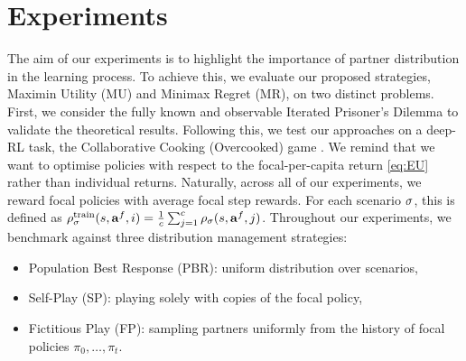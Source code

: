 \section{Experiments}
\label{seq:experiments}
The aim of our experiments is to highlight the importance of partner distribution in the learning process. To achieve this, we evaluate our proposed strategies, Maximin Utility (MU) and Minimax Regret (MR), on two distinct problems. First, we consider the fully known and observable Iterated Prisoner's Dilemma to validate the theoretical results. Following this, we test our approaches on a deep-RL task, the Collaborative Cooking (Overcooked) game \citep{carroll_utility_learning_about_2019, strouse_collaboration_with_humans_2021, leibo_scalable_evaluation_multi_2021,agapiou_melting_pot_2_2023}.
We remind that we want to optimise policies with respect to the focal-per-capita return \eqref{eq:EU} rather than individual returns. Naturally, across all of our experiments, we reward focal policies with average focal step rewards. For each scenario $\sigma$, this is defined as $
    \rho^\text{train}_\sigma(s, \mathbf{a}^f, i) = \frac{1}{c} \sum_{j=1}^c \rho_\sigma(s, \mathbf{a}^f, j)
$.
Throughout our experiments, we benchmark against three distribution management strategies: 
\begin{itemize}[leftmargin=12pt]
    \item Population Best Response (PBR): uniform distribution over scenarios,
    \item Self-Play (SP): playing solely with copies of the focal policy,
    \item Fictitious Play (FP): sampling partners uniformly from the history of focal policies $\pi_0, \dots, \pi_t$.
\end{itemize}



